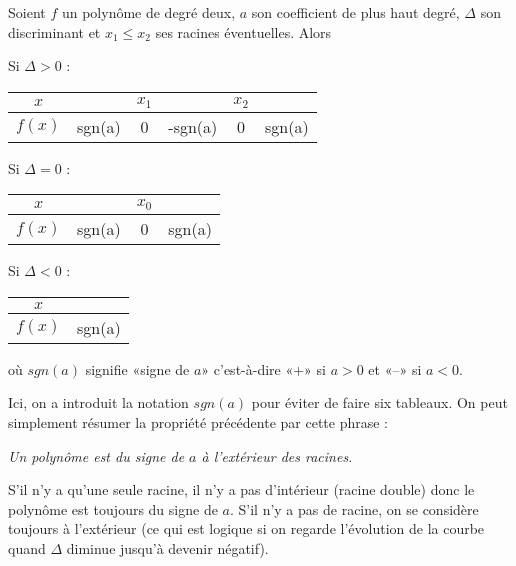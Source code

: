 \documentclass[cours]{lycee-deveaux}
\begin{document}
\begin{propriete}
  \label{propriete-tabsgn}
  Soient $f$ un polynôme de degré deux, $a$ son coefficient de plus haut degré, $\Delta$ son discriminant et $x_1 \leq x_2$ ses racines éventuelles.
  Alors 
  
  Si $\Delta>0$ : $\qquad$
  \begin{tabular}{c|ccccc}
    $x$ & & $x_1$ & & $x_2$ & \\
    \hline
    $f(x)$ & sgn(a) & 0 & -sgn(a) & 0 & sgn(a) \\
  \end{tabular}
  
  \bigskip
  
  Si $\Delta=0$ : $\qquad$
  \begin{tabular}{c|ccc}
    $x$ & & $x_0$ & \\
    \hline
    $f(x)$ & sgn(a) & 0 & sgn(a) \\
  \end{tabular}
  
  \bigskip
  
  Si $\Delta<0$ : $\qquad$
  \begin{tabular}{c|c}
    $x$ &  \\
    \hline
    $f(x)$ & sgn(a) \\
  \end{tabular}
  
  \bigskip
  
  où $sgn(a)$ signifie «signe de $a$» c'est-à-dire «+» si $a>0$ et «--» si $a<0$.
\end{propriete}

Ici, on a introduit la notation $sgn(a)$ pour éviter de faire six tableaux.
On peut simplement résumer la propriété précédente par cette phrase :

\begin{center}
  \emph{Un polynôme est du signe de $a$ à l'extérieur des racines.}
\end{center}

S'il n'y a qu'une seule racine, il n'y a pas d'intérieur (racine double) donc
le polynôme est toujours du signe de $a$.
S'il n'y a pas de racine, on se considère toujours à l'extérieur (ce qui est logique si on regarde l'évolution de la courbe
quand $\Delta$ diminue jusqu'à devenir négatif).
\end{document}
